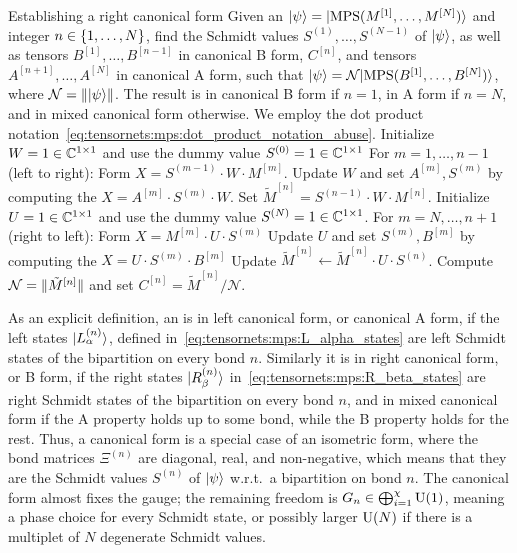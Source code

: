 \begin{Algorithm}{Establishing a right canonical form}{
    \label{algo:tensornets:mps:right_canonical_form}
    Given an  $\ket{\psi} = \ket{\text{MPS}(M^{[1]},\dots,M^{[N]})}$ and integer $n\in\set{1,\dots,N}$, find the Schmidt values $S^{(1)},\dots,S^{(N-1)}$ of $\ket{\psi}$, as well as tensors $B^{[1]},\dots,B^{[n-1]}$ in canonical B form, $C^{[n]}$, and tensors $A^{[n+1]},\dots,A^{[N]}$ in canonical A form, such that $\ket{\psi} = \mathcal{N} \ket{\text{MPS}(B^{[1]},\dots,B^{[N]})}$, where $\mathcal{N} = \norm\psiket$.
    The result is in canonical B form if $n=1$, in A form if $n=N$, and in mixed canonical form otherwise.
    We employ the dot product notation~\eqref{eq:tensornets:mps:dot_product_notation_abuse}.
}
    \step Initialize $W = 1 \in \mathbb{C}^{1 \times 1}$ and use the dummy value $S^{(0)} = 1 \in \mathbb{C}^{1 \times 1}$
    \step For $m=1,\dots,n-1$ (left to right):
    \step \quad Form $X = S^{(m-1)} \cdot W \cdot M^{[m]}$.
    \step \quad Update $W$ and set $A^{[m]}, S^{(m)}$ by computing the  $X = A^{[m]} \cdot S^{(m)} \cdot W$.
    \step Set $\tilde{M}^{[n]} = S^{(n-1)} \cdot W \cdot M^{[n]}$.
    \step Initialize $U = 1 \in \mathbb{C}^{1 \times 1}$ and use the dummy value $S^{(N)} = 1 \in \mathbb{C}^{1 \times 1}$.
    \step For $m=N,\dots,n+1$ (right to left):
    \step \quad Form $X = M^{[m]} \cdot U \cdot S^{(m)}$
    \step \quad Update $U$ and set $S^{(m)}, B^{[m]}$ by computing the  $X = U \cdot S^{(m)} \cdot B^{[m]}$
    \step Update $\tilde{M}^{[n]} \gets \tilde{M}^{[n]} \cdot U \cdot S^{(n)}$.
    \step Compute $\mathcal{N} = \norm{\tilde{M}^{[n]}}$ and set $C^{[n]} = \tilde{M}^{[n]} / \mathcal{N}$.
\end{Algorithm}

As an explicit definition, an  is in left canonical form, or canonical A form, if the left states $\ket{L^{(n)}_\alpha}$, defined in~\eqref{eq:tensornets:mps:L_alpha_states} are left Schmidt states of the bipartition on every bond $n$.
%
Similarly it is in right canonical form, or B form, if the right states $\ket{R_\beta^{(n)}}$ in~\eqref{eq:tensornets:mps:R_beta_states} are right Schmidt states of the bipartition on every bond $n$, and in mixed canonical form if the A property holds up to some bond, while the B property holds for the rest.
%
Thus, a canonical form is a special case of an isometric form, where the bond matrices $\Xi^{(n)}$ are diagonal, real, and non-negative, which means that they are the Schmidt values $S^{(n)}$ of $\psiket$ w.r.t.~a bipartition on bond $n$.
%
The canonical form almost fixes the gauge; the remaining freedom is $G_n \in \bigoplus_{i=1}^{\chi} \mathrm{U}(1)$, meaning a phase choice for every Schmidt state, or possibly larger $\mathrm{U}(N)$ if there is a multiplet of $N$ degenerate Schmidt values.

